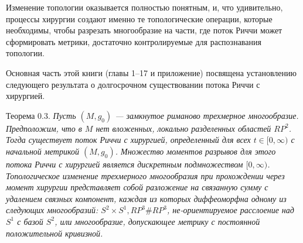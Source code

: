 Изменение топологии оказывается полностью понятным, и, что удивительно, 
процессы хирургии создают именно те топологические операции, которые необходимы, 
чтобы разрезать многообразие на части, где поток Риччи может сформировать 
метрики, достаточно контролируемые для распознавания топологии.

Основная часть этой книги (главы 1–17 и приложение) посвящена установлению 
следующего результата о долгосрочном существовании потока Риччи с хирургией.

Теорема 0.3. \textit{Пусть $(M, g_{0})$ — замкнутое риманово трехмерное 
многообразие. Предположим, что в $M$ нет вложенных, локально разделенных областей 
$RP^{2}$. Тогда существует поток Риччи с хирургией, 
определенный для всех $t\in [0,\infty)$ с начальной метрикой $(M, g_{0})$. 
Множество моментов разрывов для этого потока Риччи с хирургией является 
дискретным подмножеством $[0,\infty)$.
Топологическое изменение трехмерного многообразия при прохождении через 
момент хирургии представляет собой разложение на связанную сумму с 
удалением связных компонент, каждая из которых диффеоморфна одному из 
следующих многообразий: $S^{2}\times S^{1}, RP^{3} \# RP^{3}$, не-ориентируемое 
расслоение над $S^{1}$ с базой $S^{2}$, или многообразие, допускающее 
метрику с постоянной положительной кривизной.}